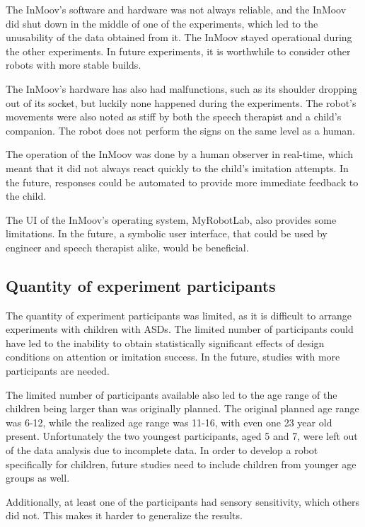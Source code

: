 The InMoov's software and hardware was not always reliable, and the InMoov did shut down in the middle of one of the experiments, which led to the unusability of the data obtained from it. The InMoov stayed operational during the other experiments. In future experiments, it is worthwhile to consider other robots with more stable builds. 

The InMoov's hardware has also had malfunctions, such as its shoulder dropping out of its socket, but luckily none happened during the experiments. The robot's movements were also noted as stiff by both the speech therapist and a child's companion. The robot does not perform the signs on the same level as a human.

The operation of the InMoov was done by a human observer in real-time, which meant that it did not always react quickly to the child's imitation attempts. In the future, responses could be automated to provide more immediate feedback to the child.

The UI of the InMoov's operating system, MyRobotLab, also provides some limitations. In the future, a symbolic user interface, that could be used by engineer and speech therapist alike, would be beneficial.


\subsection{Quantity of experiment participants}

The quantity of experiment participants was limited, as it is difficult to arrange experiments with children with ASDs. The limited number of participants could have led to the inability to obtain statistically significant effects of design conditions on attention or imitation success. In the future, studies with more participants are needed.

The limited number of participants available also led to the age range of the children being larger than was originally planned. The original planned age range was 6-12, while the realized age range was 11-16, with even one 23 year old present. Unfortunately the two youngest participants, aged 5 and 7, were left out of the data analysis due to incomplete data. In order to develop a robot specifically for children, future studies need to include children from younger age groups as well.

Additionally, at least one of the participants had sensory sensitivity, which others did not. This makes it harder to generalize the results.

